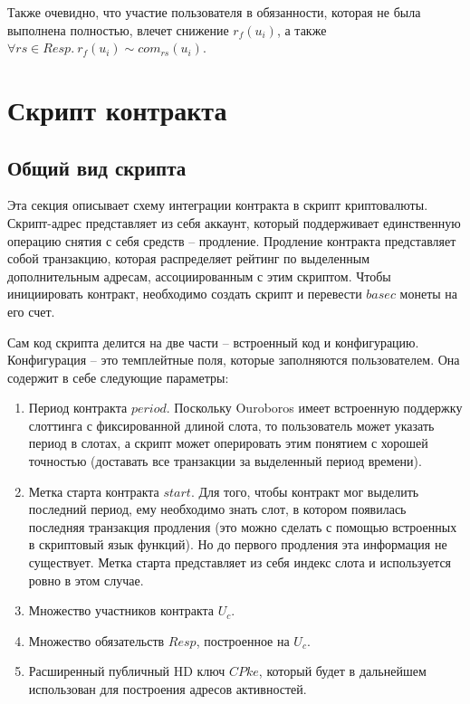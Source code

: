 \documentclass[specification,annotation]{itmo-student-thesis}
\begin{document}
Также очевидно, что участие пользователя в обязанности, которая не
была выполнена полностью, влечет снижение $r_f(u_i)$, а также $\forall
rs \in Resp . \ r_f(u_i) \sim com_{rs}(u_i)$.

\section{Скрипт контракта}
\label{sec:smartcontract}

\subsection{Общий вид скрипта}

Эта секция описывает схему интеграции контракта в скрипт
криптовалюты. Скрипт-адрес представляет из себя аккаунт, который
поддерживает единственную операцию снятия с себя средств --
продление. Продление контракта представляет собой транзакцию, которая
распределяет рейтинг по выделенным дополнительным адресам,
ассоциированным с этим скриптом. Чтобы инициировать контракт,
необходимо создать скрипт и перевести $basec$ монеты на его счет.

Сам код скрипта делится на две части -- встроенный код и
конфигурацию. Конфигурация -- это темплейтные поля, которые
заполняются пользователем. Она содержит в себе следующие параметры:

\begin{enumerate}
\item Период контракта $period$. Поскольку Ouroboros имеет встроенную
  поддержку слоттинга с фиксированной длиной слота, то пользователь
  может указать период в слотах, а скрипт может оперировать этим
  понятием с хорошей точностью (доставать все транзакции за выделенный
  период времени).
\item Метка старта контракта $start$. Для того, чтобы контракт мог
  выделить последний период, ему необходимо знать слот, в котором
  появилась последняя транзакция продления (это можно сделать с
  помощью встроенных в скриптовый язык функций). Но до первого
  продления эта информация не существует. Метка старта представляет из
  себя индекс слота и используется ровно в этом случае.
\item Множество участников контракта $U_c$.
\item Множество обязательств $Resp$, построенное на $U_c$.
\item Расширенный публичный HD ключ $CPke$, который будет в дальнейшем
  использован для построения адресов активностей.
\end{enumerate}
\end{document}
